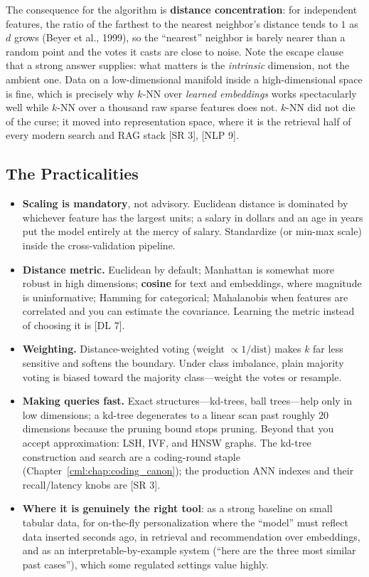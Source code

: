 The consequence for the algorithm is \textbf{distance concentration}: for independent features, the ratio of the farthest to the nearest neighbor's distance tends to $1$ as $d$ grows (Beyer et al., 1999), so the ``nearest'' neighbor is barely nearer than a random point and the votes it casts are close to noise. Note the escape clause that a strong answer supplies: what matters is the \emph{intrinsic} dimension, not the ambient one. Data on a low-dimensional manifold inside a high-dimensional space is fine, which is precisely why $k$-NN over \emph{learned embeddings} works spectacularly well while $k$-NN over a thousand raw sparse features does not. $k$-NN did not die of the curse; it moved into representation space, where it is the retrieval half of every modern search and RAG stack [SR 3], [NLP 9].

\subsection{The Practicalities}

\begin{itemize}
    \item \textbf{Scaling is mandatory}, not advisory. Euclidean distance is dominated by whichever feature has the largest units; a salary in dollars and an age in years put the model entirely at the mercy of salary. Standardize (or min-max scale) inside the cross-validation pipeline.
    \item \textbf{Distance metric.} Euclidean by default; Manhattan is somewhat more robust in high dimensions; \textbf{cosine} for text and embeddings, where magnitude is uninformative; Hamming for categorical; Mahalanobis when features are correlated and you can estimate the covariance. Learning the metric instead of choosing it is [DL 7].
    \item \textbf{Weighting.} Distance-weighted voting (weight $\propto 1/\text{dist}$) makes $k$ far less sensitive and softens the boundary. Under class imbalance, plain majority voting is biased toward the majority class---weight the votes or resample.
    \item \textbf{Making queries fast.} Exact structures---kd-trees, ball trees---help only in low dimensions; a kd-tree degenerates to a linear scan past roughly $20$ dimensions because the pruning bound stops pruning. Beyond that you accept approximation: LSH, IVF, and HNSW graphs. The kd-tree construction and search are a coding-round staple (Chapter~\ref{cml:chap:coding_canon}); the production ANN indexes and their recall/latency knobs are [SR 3].
    \item \textbf{Where it is genuinely the right tool}: as a strong baseline on small tabular data, for on-the-fly personalization where the ``model'' must reflect data inserted seconds ago, in retrieval and recommendation over embeddings, and as an interpretable-by-example system (``here are the three most similar past cases''), which some regulated settings value highly.
\end{itemize}

